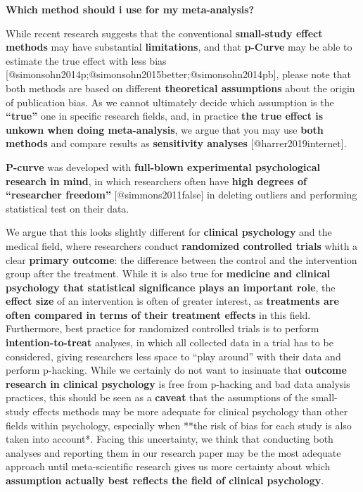\documentclass[]{book}
\theoremstyle{definition}
\theoremstyle{definition}
\theoremstyle{definition}
\theoremstyle{remark}
\begin{document}
\begin{rmdinfo}
\textbf{Which method should i use for my meta-analysis?}

While recent research suggests that the conventional \textbf{small-study
effect methods} may have substantial \textbf{limitations}, and that
\textbf{p-Curve} may be able to estimate the true effect with less bias
{[}@simonsohn2014p;@simonsohn2015better;@simonsohn2014pb{]}, please note
that both methods are based on different \textbf{theoretical
assumptions} about the origin of publication bias. As we cannot
ultimately decide which assumption is the \textbf{``true''} one in
specific research fields, and, in practice \textbf{the true effect is
unkown when doing meta-analysis}, we argue that you may use \textbf{both
methods} and compare results as \textbf{sensitivity analyses}
{[}@harrer2019internet{]}.

\textbf{P-curve} was developed with \textbf{full-blown experimental
psychological research in mind}, in which researchers often have
\textbf{high degrees of ``researcher freedom''} {[}@simmons2011false{]}
in deleting outliers and performing statistical test on their data.

We argue that this looks slightly different for \textbf{clinical
psychology} and the medical field, where researchers conduct
\textbf{randomized controlled trials} whith a clear \textbf{primary
outcome}: the difference between the control and the intervention group
after the treatment. While it is also true for \textbf{medicine and
clinical psychology that statistical significance plays an important
role}, the \textbf{effect size} of an intervention is often of greater
interest, as \textbf{treatments are often compared in terms of their
treatment effects} in this field. Furthermore, best practice for
randomized controlled trials is to perform \textbf{intention-to-treat}
analyses, in which all collected data in a trial has to be considered,
giving researchers less space to ``play around'' with their data and
perform p-hacking. While we certainly do not want to insinuate that
\textbf{outcome research in clinical psychology} is free from p-hacking
and bad data analysis practices, this should be seen as a
\textbf{caveat} that the assumptions of the small-study effects methods
may be more adequate for clinical psychology than other fields within
psychology, especially when **the risk of bias for each study is also
taken into account*. Facing this uncertainty, we think that conducting
both analyses and reporting them in our research paper may be the most
adequate approach until meta-scientific research gives us more certainty
about which \textbf{assumption actually best reflects the field of
clinical psychology}.
\end{rmdinfo}
\end{document}

